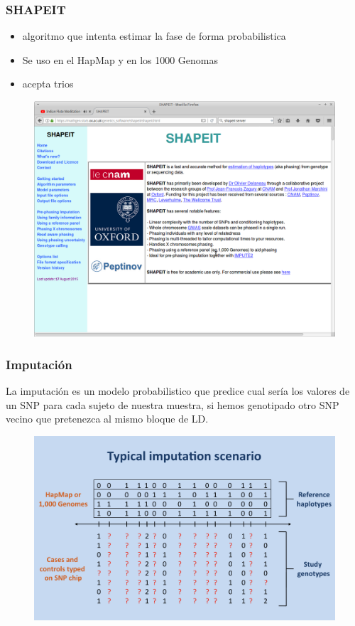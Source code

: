 \documentclass{beamer}\usepackage[]{graphicx}\usepackage[]{color}
\begin{document}
\begin{frame}
\frametitle{SHAPEIT}

\begin{itemize}
\item algoritmo que intenta estimar la fase de forma probabilistica
\item Se uso en el HapMap y en los 1000 Genomas 
\item acepta trios 
\end{itemize}

\begin{figure}[htbp]
\begin{center}
\includegraphics[width=.5\linewidth]{shapeit.png}
\end{center}
\end{figure}

\end{frame}

\begin{frame}
\frametitle{Imputaci\'on}
La imputaci\'on es un modelo probabilistico que predice cual ser\'ia los valores de un
SNP para cada sujeto de nuestra muestra, si hemos genotipado otro SNP vecino que
pretenezca al mismo bloque de LD.

\begin{figure}[htbp]
\begin{center}
\includegraphics[width=.5\linewidth]{scenarioA.png}
\end{center}
\end{figure}

\end{frame}
\end{document}
